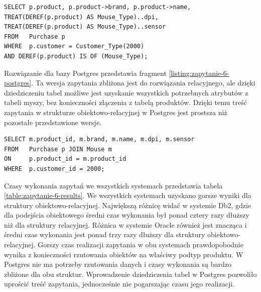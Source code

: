 \documentclass[a4paper,twoside,12pt]{book}
\begin{document}
\begin{lstlisting}[style=SQL, caption={Zapytanie szóste w Db2.}, label={listing:zapytanie-6-db2}, captionpos=b]
SELECT p.product, p.product->brand, p.product->name, 
TREAT(DEREF(p.product) AS Mouse_Type)..dpi,
TREAT(DEREF(p.product) AS Mouse_Type)..sensor
FROM   Purchase p
WHERE  p.customer = Customer_Type(2000) 
AND DEREF(p.product) IS OF (Mouse_Type);
\end{lstlisting}

Rozwiązanie dla bazy Postgres przedstawia fragment \ref{listing:zapytanie-6-postgres}. Ta wersja zapytania zbliżona jest do rozwiązania relacyjnego, ale dzięki dziedziczeniu tabel możliwe jest uzyskanie wszystkich potrzebnych atrybutów z tabeli myszy, bez konieczności złączenia z tabelą produktów. Dzięki temu treść zapytania w strukturze obiektowo-relacyjnej w Postgres jest prostsza niż pozostałe przedstawione wersje.

\begin{lstlisting}[style=SQL, caption={Zapytanie szóste w Postgres}, label={listing:zapytanie-6-postgres}, captionpos=b]
SELECT m.product_id, m.brand, m.name, m.dpi, m.sensor
FROM   Purchase p JOIN Mouse m 
ON     p.product_id = m.product_id
WHERE  p.customer_id = 2000;
\end{lstlisting}

Czasy wykonania zapytań we wszystkich systemach przedstawia tabela \ref{table:zapytanie-6-results}. We wszystkich systemach uzyskano gorsze wyniki dla struktury obiektowo-relacyjnej. Największą różnicę widać w systemie Db2, gdzie dla podejścia obiektowego średni czas wykonania był ponad cztery razy dłuższy niż dla struktury relacyjnej. Różnica w systemie Oracle również jest znacząca i średni czas wykonania jest ponad trzy razy dłuższy dla struktury obiektowo-relacyjnej. Gorszy czas realizacji zapytania w obu systemach prawdopobodnie wynika z konieczności rzutowania obiektów na właściwy podtyp produktu. W Postgres nie ma potrzeby rzutowania danych i czasy wykonania są bardzo zbliżone dla obu struktur. Wprowadzenie dziedziczenia tabel w Postgres pozwoliło uprościć treść zapytania, jednocześnie nie pogarszając czasu jego realizacji.
\end{document}
